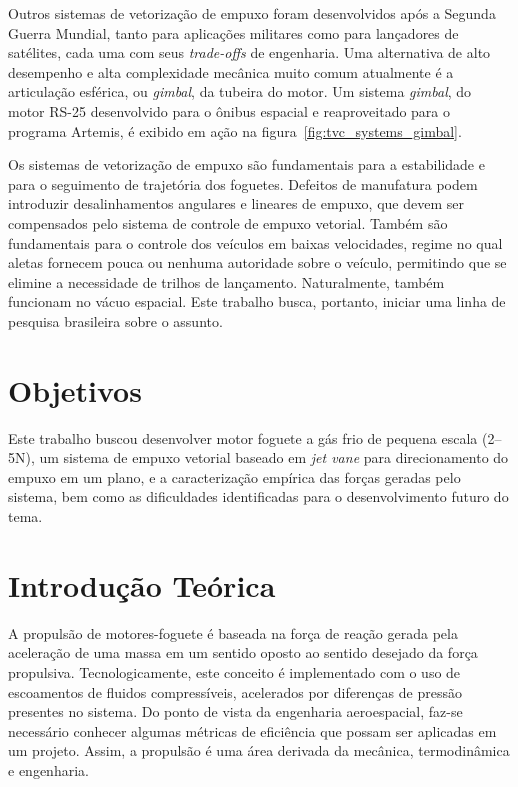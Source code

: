 Outros sistemas de vetorização de empuxo foram desenvolvidos após a Segunda Guerra Mundial, tanto para aplicações militares como para lançadores de satélites, cada uma com seus \textit{trade-offs} de engenharia. Uma alternativa de alto desempenho e alta complexidade mecânica muito comum atualmente é a articulação esférica, ou \textit{gimbal}, da tubeira do motor. Um sistema \textit{gimbal}, do motor RS-25 desenvolvido para o ônibus espacial e reaproveitado para o programa Artemis, é exibido em ação na figura~\ref{fig:tvc_systems_gimbal}.

Os sistemas de vetorização de empuxo são fundamentais para a estabilidade e para o seguimento de trajetória dos foguetes. Defeitos de manufatura podem introduzir desalinhamentos angulares e lineares de empuxo, que devem ser compensados pelo sistema de controle de empuxo vetorial. Também são fundamentais para o controle dos veículos em baixas velocidades, regime no qual aletas fornecem pouca ou nenhuma autoridade sobre o veículo, permitindo que se elimine a necessidade de trilhos de lançamento. Naturalmente, também funcionam no vácuo espacial. Este trabalho busca, portanto, iniciar uma linha de pesquisa brasileira sobre o assunto.

\section{Objetivos}

Este trabalho buscou desenvolver motor foguete a gás frio de pequena escala (2--5N), um sistema de empuxo vetorial baseado em \textit{jet vane} para direcionamento do empuxo em um plano, e a caracterização empírica das forças geradas pelo sistema, bem como as dificuldades identificadas para o desenvolvimento futuro do tema.

\section{Introdução Teórica}\label{sec:intro}
A propulsão de motores-foguete é baseada na força de reação gerada pela aceleração de uma massa em um sentido oposto ao sentido desejado da força propulsiva. Tecnologicamente, este conceito é implementado com o uso de escoamentos de fluidos compressíveis, acelerados por diferenças de pressão presentes no sistema. Do ponto de vista da engenharia aeroespacial, faz-se necessário conhecer algumas métricas de eficiência que possam ser aplicadas em um projeto. Assim, a propulsão é uma área derivada da mecânica, termodinâmica e engenharia.

